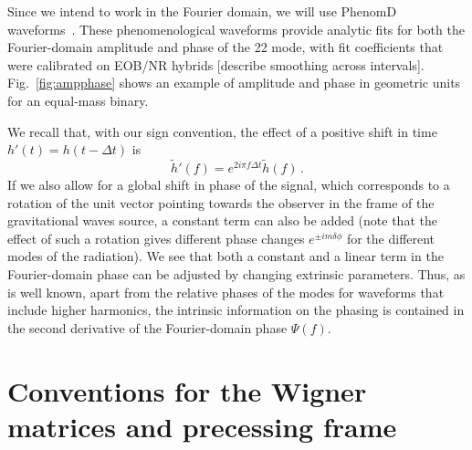 \documentclass[aps,showpacs,twocolumn,
prd,superscriptaddress,nofootinbib]{revtex4-1}
\newcommand{\be}{\begin{equation}}
\newcommand{\ee}{\end{equation}}
\newcommand{\Hz}{\,\mathrm{Hz}}
\newcommand{\SM}[1]{{\color{Red} #1}}
\begin{document}
Since we intend to work in the Fourier domain, we will use PhenomD waveforms~\cite{Khan+15}. These phenomenological waveforms provide analytic fits for both the Fourier-domain amplitude and phase of the 22 mode, with fit coefficients that were calibrated on EOB/NR hybrids [describe smoothing across intervals]. Fig.~\ref{fig:ampphase} shows an example of amplitude and phase in geometric units for an equal-mass binary.


We recall that, with our sign convention, the effect of a positive shift in time $h' (t) = h(t- \Delta t)$ is
\be
	\tilde{h}'(f) = e^{2i\pi f \Delta t} \tilde{h}(f) \,.
\ee
If we also allow for a global shift in phase of the signal, which corresponds to a rotation of the unit vector pointing towards the observer in the frame of the gravitational waves source, a constant term can also be added (note that the effect of such a rotation gives different phase changes $e^{\pm i m \delta \phi}$ for the different modes of the radiation). We see that both a constant and a linear term in the Fourier-domain phase can be adjusted by changing extrinsic parameters. Thus, as is well known, apart from the relative phases of the modes for waveforms that include higher harmonics, the intrinsic information on the phasing is contained in the second derivative of the Fourier-domain phase $\Psi(f)$.


\section{Conventions for the Wigner matrices and precessing frame}
\label{app:wigner}
\end{document}
